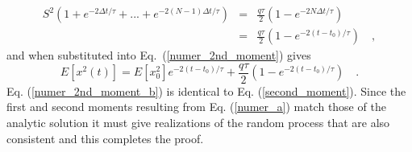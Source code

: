 \documentclass[10pt]{article}
\begin{document}
\begin{eqnarray}\label{S_simplifies}
   S^2\left(1+e^{-2\Delta t/\tau}+...+e^{-2(N-1) \Delta t/\tau}\right) & = &  \frac{q\tau}{2}\left(1-e^{-2 N \Delta t/\tau}\right) \nonumber \\
                                                                       & = &  \frac{q\tau}{2}\left(1-e^{-2(t-t_{0})/\tau}\right) \quad ,
\end{eqnarray}
and when substituted into Eq.\ (\ref{numer_2nd_moment}) gives
\begin{equation}\label{numer_2nd_moment_b}
   E\left[x^2(t)\right] = E\left[x_{0}^2\right]e^{-2(t-t_{0})/\tau} + \frac{q\tau}{2}\left(1-e^{-2(t-t_{0})/\tau}\right) \quad .
\end{equation}   
Eq. (\ref{numer_2nd_moment_b}) is identical to Eq. (\ref{second_moment}). Since the first and second moments resulting from
Eq. (\ref{numer_a}) match those of the analytic solution it must give realizations of the random process that are also consistent and this completes the proof.
\end{document}
